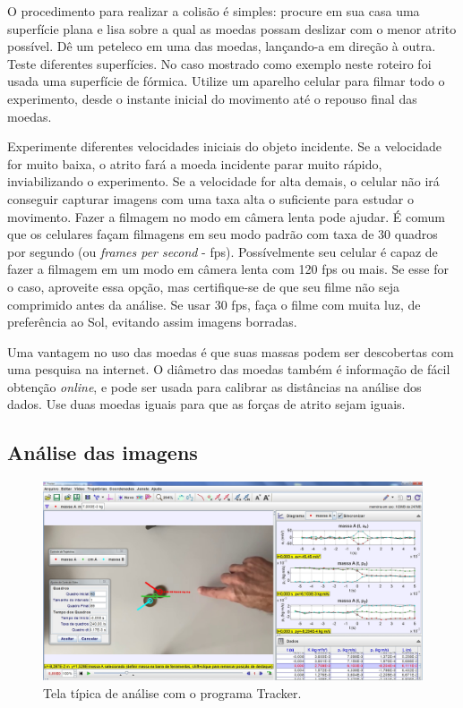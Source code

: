 O procedimento para realizar a colisão é simples: procure em sua casa uma superfície plana e lisa sobre a qual as moedas possam deslizar com o menor atrito possível. Dê um peteleco em uma das moedas, lançando-a em direção à outra. Teste diferentes superfícies. No caso mostrado como exemplo neste roteiro foi usada uma superfície de fórmica. Utilize um aparelho celular para filmar todo o experimento, desde o instante inicial do movimento até o repouso final das moedas.

Experimente diferentes velocidades iniciais do objeto incidente. Se a velocidade for muito baixa, o atrito fará a moeda incidente parar muito rápido, inviabilizando o experimento. Se a velocidade for alta demais, o celular não irá conseguir capturar imagens com uma taxa alta o suficiente para estudar o movimento. Fazer a filmagem no modo em câmera lenta pode ajudar. É comum que os celulares façam filmagens em seu modo padrão com taxa de 30 quadros por segundo (ou {\it frames per second} - fps). Possívelmente seu celular é capaz de fazer a filmagem em um modo em câmera lenta com 120 fps ou mais. Se esse for o caso, aproveite essa opção, mas certifique-se de que seu filme não seja comprimido antes da análise. Se usar 30 fps, faça o filme com muita luz, de preferência ao Sol, evitando assim imagens borradas.

Uma vantagem no uso das moedas é que suas massas podem ser descobertas com uma pesquisa na internet. O diâmetro das moedas também é informação de fácil obtenção {\it online}, e pode ser usada para calibrar as distâncias na análise dos dados. Use duas moedas iguais para que as forças de atrito sejam iguais.

\subsection{Análise das imagens}

\begin{figure}
\centering
\includegraphics[width=0.7\columnwidth]{Figuras_exp4/figcolisaomoedas1.jpg}
\caption{\label{fig:figcolisaomoedas1} Tela típica de análise com o programa Tracker.}
\end{figure}

